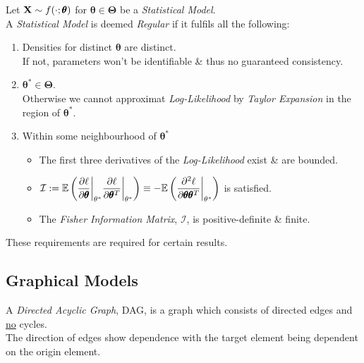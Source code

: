 \documentclass[11pt,a4paper]{article}
\begin{document}
Let $\textbf{X}\sim f(\cdot;\pmb\theta)$ for $\pmb\theta\in\pmb\Theta$ be a \textit{Statistical Model}.\\
A \textit{Statistical Model} is deemed \textit{Regular} if it fulfils all the following:
\begin{enumerate}
	\item Densities for distinct $\pmb\theta$ are distinct.\\
	\nb If not, parameters won't be identifiable \& thus no guaranteed consistency.
	\item $\pmb\theta^*\in\pmb\Theta$.\\
	\nb Otherwise we cannot approximat \textit{Log-Likelihood} by \textit{Taylor Expansion} in the region of $\pmb\theta^*$.
	\item Within some neighbourhood of $\pmb\theta^*$
	\begin{itemize}
		\item The first three derivatives of the \textit{Log-Likelihood} exist \& are bounded.
		\item $\mathcal{I}:=\mathbb{E}\left(\dfrac{\partial\ell}{\partial\pmb\theta}\bigg|_{\theta^*}\dfrac{\partial\ell}{\partial\pmb\theta^T}\bigg|_{\theta^*}\right)\equiv-\mathbb{E}\left(\dfrac{\partial^2\ell}{\partial\pmb\theta\pmb\theta^T}\bigg|_{\theta^*}\right)$ is satisfied.
		\item The \textit{Fisher Information Matrix}, $\mathcal{I}$, is positive-definite \& finite.
	\end{itemize}
\end{enumerate}
\nb These requirements are required for certain results.

\subsection{Graphical Models}

A \textit{Directed Acyclic Graph}, DAG, is a graph which consists of directed edges and \underline{no} cycles.\\
The direction of edges show dependence with the target element being dependent on the origin element.\\
\end{document}
